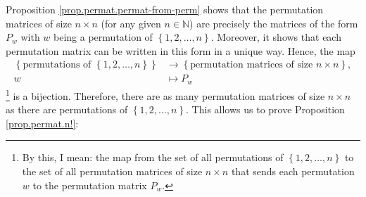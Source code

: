 \documentclass[numbers=enddot,12pt,final,onecolumn,notitlepage]{scrartcl}%
\theoremstyle{definition}
\begin{document}
Proposition \ref{prop.permat.permat-from-perm} shows that the permutation
matrices of size $n\times n$ (for any given $n\in\mathbb{N}$) are precisely
the matrices of the form $P_{w}$ with $w$ being a permutation of $\left\{
1,2,\ldots,n\right\}  $. Moreover, it shows that each permutation matrix can
be written in this form in a unique way. Hence, the map%
\begin{align*}
\left\{  \text{permutations of }\left\{  1,2,\ldots,n\right\}  \right\}   &
\rightarrow\left\{  \text{permutation matrices of size }n\times n\right\}  ,\\
w  &  \mapsto P_{w}%
\end{align*}
\footnote{By this, I mean: the map from the set of all permutations of
$\left\{  1,2,\ldots,n\right\}  $ to the set of all permutation matrices of
size $n\times n$ that sends each permutation $w$ to the permutation matrix
$P_{w}$.} is a bijection. Therefore, there are as many permutation matrices of
size $n\times n$ as there are permutations of $\left\{  1,2,\ldots,n\right\}
$. This allows us to prove Proposition \ref{prop.permat.n!}:
\end{document}
